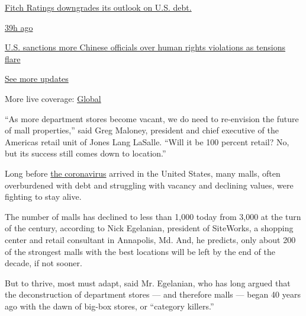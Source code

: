 \href{https://www.nytimes.com/live/2020/07/31/business/stock-market-today-coronavirus?action=click\&pgtype=Article\&state=default\&region=MAIN_CONTENT_1\&context=storylines_live_updates\#fitch-ratings-downgrades-its-outlook-on-us-debt}{Fitch
Ratings downgrades its outlook on U.S. debt.}

\href{https://www.nytimes.com/live/2020/07/31/business/stock-market-today-coronavirus?action=click\&pgtype=Article\&state=default\&region=MAIN_CONTENT_1\&context=storylines_live_updates\#us-sanctions-more-chinese-officials-over-human-rights-violations-as-tensions-flare}{39h
ago}

\href{https://www.nytimes.com/live/2020/07/31/business/stock-market-today-coronavirus?action=click\&pgtype=Article\&state=default\&region=MAIN_CONTENT_1\&context=storylines_live_updates\#us-sanctions-more-chinese-officials-over-human-rights-violations-as-tensions-flare}{U.S.
sanctions more Chinese officials over human rights violations as
tensions flare}

\href{https://www.nytimes.com/live/2020/07/31/business/stock-market-today-coronavirus?action=click\&pgtype=Article\&state=default\&region=MAIN_CONTENT_1\&context=storylines_live_updates}{See
more updates}

More live coverage:
\href{https://www.nytimes.com/2020/08/01/world/coronavirus-covid-19.html?action=click\&pgtype=Article\&state=default\&region=MAIN_CONTENT_1\&context=storylines_live_updates}{Global}

``As more department stores become vacant, we do need to re-envision the
future of mall properties,'' said Greg Maloney, president and chief
executive of the Americas retail unit of Jones Lang LaSalle. ``Will it
be 100 percent retail? No, but its success still comes down to
location.''

Long before \href{https://www.nytimes.com/news-event/coronavirus}{the
coronavirus} arrived in the United States, many malls, often
overburdened with debt and struggling with vacancy and declining values,
were fighting to stay alive.

The number of malls has declined to less than 1,000 today from 3,000 at
the turn of the century, according to Nick Egelanian, president of
SiteWorks, a shopping center and retail consultant in Annapolis, Md.
And, he predicts, only about 200 of the strongest malls with the best
locations will be left by the end of the decade, if not sooner.

But to thrive, most must adapt, said Mr. Egelanian, who has long argued
that the deconstruction of department stores --- and therefore malls ---
began 40 years ago with the dawn of big-box stores, or ``category
killers.''

